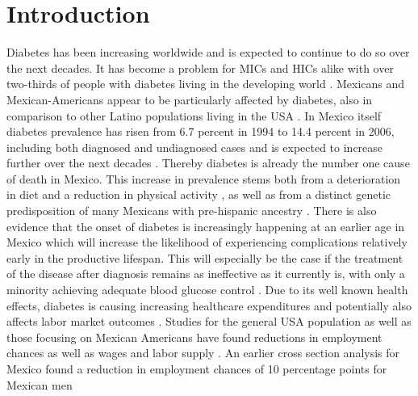 \documentclass[12pt,english,british]{article}
\begin{document}
\section{\label{sec:Introduction}Introduction }

Diabetes has been increasing worldwide and is expected to continue to do so over the next decades. It has become a problem for \ac{MICs} and \ac{HICs} alike with over two-thirds of people with diabetes living in the developing world \citep{InternationalDiabetesFederation2013}. Mexicans and Mexican-Americans appear to be particularly affected by diabetes, also in comparison to other Latino populations living in the \ac{USA} \citep{Schneiderman2014}. In Mexico itself diabetes prevalence has risen from 6.7 percent in 1994 to 14.4 percent in 2006, including both diagnosed and undiagnosed cases \citep{Barquera2013} and is expected to increase further over the next decades \citep{Meza2015}. Thereby diabetes is already the number one cause of death in Mexico. This increase in prevalence stems both from a deterioration in diet and a reduction in physical activity \citep{Barquera2008b,Basu2013}, as well as from a distinct genetic predisposition of many Mexicans with pre-hispanic ancestry \citep{Williams2013}. There is also evidence that the onset of diabetes is increasingly happening at an earlier age in Mexico \citep{Villalpando2010} which will increase the likelihood of experiencing complications relatively early in the productive lifespan. This will especially be the case if the treatment of the disease after diagnosis remains as ineffective as it currently is, with only a minority achieving adequate blood glucose control \citep{Barquera2013}. Due to its well known health effects, diabetes is causing increasing healthcare expenditures and potentially also affects labor market outcomes \citep{Seuring2015a}. Studies for the general \ac{USA} population as well as those focusing on Mexican Americans have found reductions in employment chances as well as wages and labor supply \citep{Brown2005,Brown2014,BrownIII2011,Minor2010,Minor2013}. An earlier cross section analysis for Mexico found a reduction in employment chances of 10 percentage points for Mexican men \citep{Seuring2015} 
\end{document}
